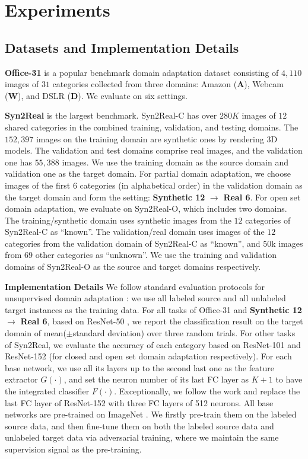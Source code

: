 \documentclass[letterpaper]{article} \usepackage{aaai20}  \usepackage{times}  \usepackage{helvet} \usepackage{courier}  \usepackage[hyphens]{url}  \usepackage{graphicx} \urlstyle{rm} \def\UrlFont{\rm}  \usepackage{graphicx}  \frenchspacing  \setlength{\pdfpagewidth}{8.5in}  \setlength{\pdfpageheight}{11in}
\begin{document}
\section{Experiments}

\subsection{Datasets and Implementation Details}
\noindent\textbf{Office-31} \cite{office31} is a popular benchmark domain adaptation dataset consisting of $4,110$ images of $31$ categories collected from three domains: Amazon (\textbf{A}), Webcam (\textbf{W}), and DSLR (\textbf{D}). We evaluate on six settings.

\noindent\textbf{Syn2Real} \cite{visda} is the largest benchmark. Syn2Real-C has over $280K$ images of $12$ shared categories in the combined training, validation, and testing domains. The $152,397$ images on the training domain are synthetic ones by rendering 3D models. The validation and test domains comprise real images, and the validation one has $55,388$ images. We use the training domain as the source domain and validation one as the target domain. For partial domain adaptation, we choose images of the first $6$ categories (in alphabetical order) in the validation domain as the target domain and form the setting: \textbf{Synthetic 12} $\rightarrow$ \textbf{Real 6}. For open set domain adaptation, we evaluate on Syn2Real-O, which includes two domains. The training/synthetic domain uses synthetic images from the $12$ categories of Syn2Real-C as ``known''. The validation/real domain uses images of the $12$ categories from the validation domain of Syn2Real-C as ``known'', and $50$k images from $69$ other categories as ``unknown''. We use the training and validation domains of Syn2Real-O as the source and target domains respectively. 

\noindent\textbf{Implementation Details} We follow standard evaluation protocols for unsupervised domain adaptation \cite{dann,tada}: we use all labeled source and all unlabeled target instances as the training data. For all tasks of Office-31 and \textbf{Synthetic 12} $\rightarrow$ \textbf{Real 6}, based on ResNet-50 \cite{resnet}, we report the classification result on the target domain of mean($\pm$standard deviation) over three random trials. For other tasks of Syn2Real, we evaluate the accuracy of each category based on ResNet-101 and ResNet-152 (for closed and open set domain adaptation respectively). For each base network, we use all its layers up to the second last one as the feature extractor $G(\cdot)$, and set the neuron number of its last FC layer as $K+1$ to have the integrated classifier $F(\cdot)$. Exceptionally, we follow the work \cite{visda} and replace the last FC layer of ResNet-152 with three FC layers of 512 neurons. All base networks are pre-trained on ImageNet \cite{imagenet}. We firstly pre-train them on the labeled source data, and then fine-tune them on both the labeled source data and unlabeled target data via adversarial training, where we maintain the same supervision signal as the pre-training. 
\end{document}
